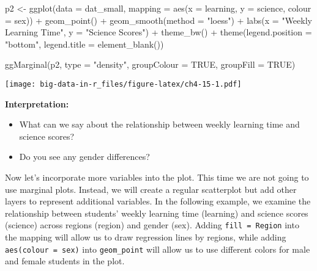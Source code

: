 \documentclass[
]{book}
\newenvironment{Shaded}{\begin{snugshade}}{\end{snugshade}}
\newcommand{\AttributeTok}[1]{\textcolor[rgb]{0.77,0.63,0.00}{#1}}
\newcommand{\ConstantTok}[1]{\textcolor[rgb]{0.00,0.00,0.00}{#1}}
\newcommand{\FunctionTok}[1]{\textcolor[rgb]{0.00,0.00,0.00}{#1}}
\newcommand{\NormalTok}[1]{#1}
\newcommand{\OtherTok}[1]{\textcolor[rgb]{0.56,0.35,0.01}{#1}}
\newcommand{\SpecialCharTok}[1]{\textcolor[rgb]{0.00,0.00,0.00}{#1}}
\newcommand{\StringTok}[1]{\textcolor[rgb]{0.31,0.60,0.02}{#1}}
\providecommand{\tightlist}{%
  \setlength{\itemsep}{0pt}\setlength{\parskip}{0pt}}
\begin{document}
\begin{Shaded}
\begin{Highlighting}[]
\NormalTok{p2 }\OtherTok{\textless{}{-}} \FunctionTok{ggplot}\NormalTok{(}\AttributeTok{data =}\NormalTok{ dat\_small,}
             \AttributeTok{mapping =} \FunctionTok{aes}\NormalTok{(}\AttributeTok{x =}\NormalTok{ learning, }\AttributeTok{y =}\NormalTok{ science,}
                           \AttributeTok{colour =}\NormalTok{ sex)) }\SpecialCharTok{+}
  \FunctionTok{geom\_point}\NormalTok{() }\SpecialCharTok{+}
  \FunctionTok{geom\_smooth}\NormalTok{(}\AttributeTok{method =} \StringTok{"loess"}\NormalTok{) }\SpecialCharTok{+}
  \FunctionTok{labs}\NormalTok{(}\AttributeTok{x =} \StringTok{"Weekly Learning Time"}\NormalTok{, }\AttributeTok{y =} \StringTok{"Science Scores"}\NormalTok{) }\SpecialCharTok{+}
  \FunctionTok{theme\_bw}\NormalTok{() }\SpecialCharTok{+}
  \FunctionTok{theme}\NormalTok{(}\AttributeTok{legend.position =} \StringTok{"bottom"}\NormalTok{,}
        \AttributeTok{legend.title =} \FunctionTok{element\_blank}\NormalTok{())}

\FunctionTok{ggMarginal}\NormalTok{(p2, }\AttributeTok{type =} \StringTok{"density"}\NormalTok{, }\AttributeTok{groupColour =} \ConstantTok{TRUE}\NormalTok{, }\AttributeTok{groupFill =} \ConstantTok{TRUE}\NormalTok{)}
\end{Highlighting}
\end{Shaded}

\texttt{[image: big-data-in-r\_files/figure-latex/ch4-15-1.pdf]}

\textbf{Interpretation:}

\begin{itemize}
\tightlist
\item
  What can we say about the relationship between weekly learning time and science scores?
\item
  Do you see any gender differences?
\end{itemize}

Now let's incorporate more variables into the plot. This time we are not going to use marginal plots. Instead, we will create a regular scatterplot but add other layers to represent additional variables. In the following example, we examine the relationship between students' weekly learning time (learning) and science scores (science) across regions (region) and gender (sex). Adding \texttt{fill\ =\ Region} into the mapping will allow us to draw regression lines by regions, while adding \texttt{aes(colour\ =\ sex)} into \texttt{geom\_point} will allow us to use different colors for male and female students in the plot.
\end{document}
